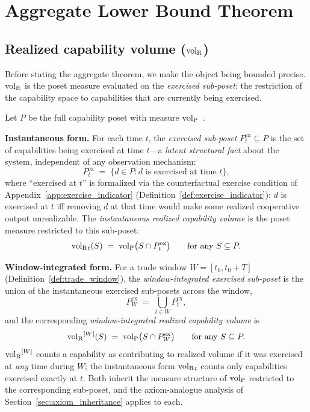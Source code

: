 \section{Aggregate Lower Bound Theorem}
\label{sec:lower_bound}

\subsection{Realized capability volume (${\operatorname{vol}_{\mathrm{R}}}$)}

Before stating the aggregate theorem, we make the object being
bounded precise.  ${\operatorname{vol}_{\mathrm{R}}}$ is the poset measure evaluated on the
\emph{exercised sub-poset}: the restriction of the capability
space to capabilities that are currently being exercised.

\begin{definition}
\label{def:volR}
Let $P$ be the full capability poset with measure
${\operatorname{vol}_{\mathrm{P}}}$~\citep[Proposition~1]{lasser2026poset}.

\medskip\noindent
\textbf{Instantaneous form.}
For each time $t$, the \emph{exercised sub-poset}
$P^{\mathrm{ex}}_t \subseteq P$ is the set of capabilities being
exercised at time $t$---a \emph{latent structural fact} about
the system, independent of any observation mechanism:
\[
  P^{\mathrm{ex}}_t \;=\; \{d \in P : d \text{ is exercised at
  time } t\},
\]
where ``exercised at $t$'' is formalized via the counterfactual
exercise condition of Appendix~\ref{app:exercise_indicator}
(Definition~\ref{def:exercise_indicator}): $d$ is exercised at
$t$ iff removing $d$ at that time would make some realized
cooperative output unrealizable.  The \emph{instantaneous
realized capability volume} is the poset measure restricted to
this sub-poset:
\[
  {\operatorname{vol}_{\mathrm{R}}}_t(S) \;=\; {\operatorname{vol}_{\mathrm{P}}}\bigl(S \cap P^{\mathrm{ex}}_t\bigr)
  \qquad \text{for any } S \subseteq P.
\]

\medskip\noindent
\textbf{Window-integrated form.}
For a trade window $W = [t_0, t_0 + T]$
(Definition~\ref{def:trade_window}), the \emph{window-integrated
exercised sub-poset} is the union of the instantaneous
exercised sub-posets across the window,
\[
  P^{\mathrm{ex}}_W \;=\; \bigcup_{t \in W}
  P^{\mathrm{ex}}_t,
\]
and the corresponding \emph{window-integrated realized
capability volume} is
\[
  {\operatorname{vol}_{\mathrm{R}}}^{[W]}(S) \;=\; {\operatorname{vol}_{\mathrm{P}}}\bigl(S \cap P^{\mathrm{ex}}_W\bigr)
  \qquad \text{for any } S \subseteq P.
\]
${\operatorname{vol}_{\mathrm{R}}}^{[W]}$ counts a capability as contributing to realized
volume if it was exercised at \emph{any} time during $W$; the
instantaneous form ${\operatorname{vol}_{\mathrm{R}}}_t$ counts only capabilities exercised
exactly at $t$.  Both inherit the measure structure of ${\operatorname{vol}_{\mathrm{P}}}$
restricted to the corresponding sub-poset, and the
axiom-analogue analysis of
Section~\ref{sec:axiom_inheritance} applies to each.


\end{definition}
